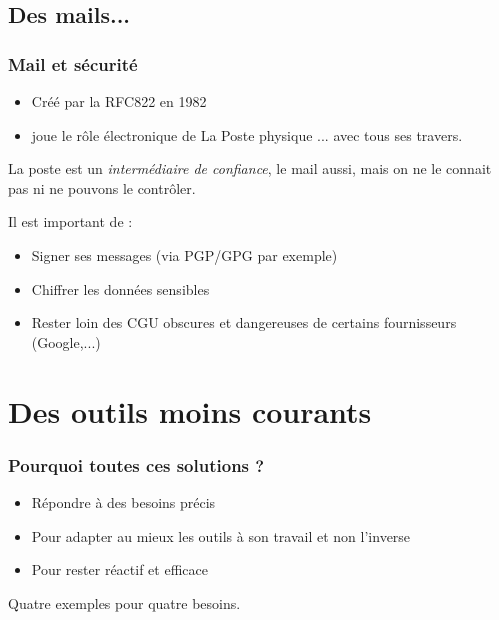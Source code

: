 \documentclass{beamer}
\begin{document}
\subsection{Des mails...} %

\begin{frame}
    \frametitle{Mail et sécurité}

    \begin{itemize}
        \item Créé par la RFC822 en 1982
        \item joue le rôle électronique de La Poste physique ... avec tous ses travers.
    \end{itemize}

    \pause{}
    
    La poste est un \textit{intermédiaire de confiance}, le mail aussi, mais on ne le connait pas ni ne pouvons le
    contrôler.

    \pause{}

    \medskip

    Il est important de :

    \begin{itemize}
        \item Signer ses messages (via PGP/GPG par exemple)
        \item Chiffrer les données sensibles
        \item Rester loin des CGU obscures et dangereuses de certains fournisseurs (Google,...)
    \end{itemize}
\end{frame}

\section{Des outils moins courants} %

\begin{frame}
    \frametitle{Pourquoi toutes ces solutions ?}

    \begin{itemize}
        \item Répondre à des besoins précis
        \item Pour adapter au mieux les outils à son travail et non l'inverse
        \item Pour rester réactif et efficace
    \end{itemize}

    \pause{}

    Quatre exemples pour quatre besoins.
\end{frame}
\end{document}
